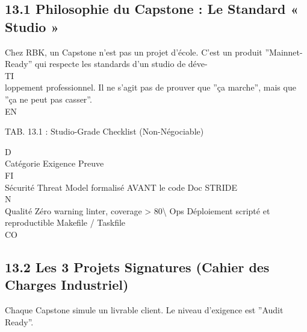 \documentclass[12pt,landscape,a4paper]{article}
\begin{document}
\subsection{13.1 Philosophie du Capstone : Le Standard « Studio »}
Chez RBK, un Capstone n’est pas un projet d’école. C’est un produit ”Mainnet-Ready” qui respecte les standards d’un studio de déve-\\
\vspace{0.5em}
\vspace{0.5em}
\vspace{0.5em}
\vspace{0.5em}
TI\\
loppement professionnel. Il ne s’agit pas de prouver que ”ça marche”, mais que ”ça ne peut pas casser”.\\
\vspace{0.5em}
\vspace{0.5em}
\vspace{0.5em}
\vspace{0.5em}
EN\\
\begin{center}\begin{tabular}TAB. 13.1 : Studio-Grade Checklist (Non-Négociable)\end{tabular}\end{center}
\vspace{0.5em}
\vspace{0.5em}
\vspace{0.5em}
\vspace{0.5em}
D\\
Catégorie Exigence                                      Preuve\\
\vspace{0.5em}
\vspace{0.5em}
\vspace{0.5em}
\vspace{0.5em}
FI\\
Sécurité  Threat Model formalisé AVANT le code          Doc STRIDE\\
\vspace{0.5em}
\vspace{0.5em}
N\\
Qualité   Zéro warning linter, coverage \textgreater{} 80\textbackslash{}%
Ops       Déploiement scripté et reproductible          Makefile / Taskfile\\
CO\\
\vspace{0.5em}
\subsection{13.2 Les 3 Projets Signatures (Cahier des Charges Industriel)}
Chaque Capstone simule un livrable client. Le niveau d’exigence est ”Audit Ready”.\\
\vspace{0.5em}
\vspace{0.5em}
\end{document}
